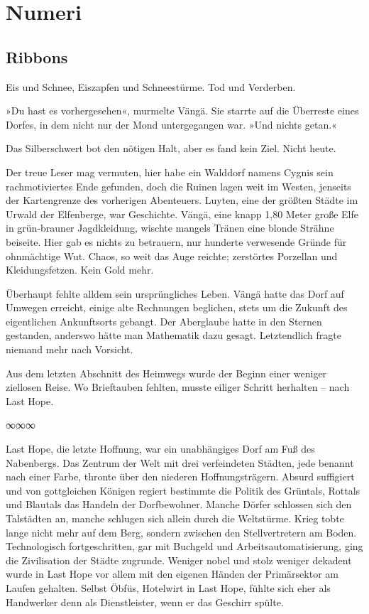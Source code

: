 \part{Numeri}

\chapter{Ribbons}

Eis und Schnee, Eiszapfen und Schneestürme. Tod und Verderben.

»Du hast es vorhergesehen«, murmelte Vängä. Sie starrte auf die Überreste eines Dorfes, in dem nicht nur der Mond untergegangen war. »Und nichts getan.«

Das Silberschwert bot den nötigen Halt, aber es fand kein Ziel. Nicht heute.

Der treue Leser mag vermuten, hier habe ein Walddorf namens Cygnis sein rachmotiviertes Ende gefunden, doch die Ruinen lagen weit im Westen, jenseits der Kartengrenze des vorherigen Abenteuers. Luyten, eine der größten Städte im Urwald der Elfenberge, war Geschichte. Vängä, eine knapp 1,80 Meter große Elfe in grün-brauner Jagdkleidung, wischte mangels Tränen eine blonde Strähne beiseite. Hier gab es nichts zu betrauern, nur hunderte verwesende Gründe für ohnmächtige Wut. Chaos, so weit das Auge reichte; zerstörtes Porzellan und Kleidungsfetzen. Kein Gold mehr.

Überhaupt fehlte alldem sein ursprüngliches Leben. Vängä hatte das Dorf auf Umwegen erreicht, einige alte Rechnungen beglichen, stets um die Zukunft des eigentlichen Ankunftsorts gebangt. Der Aberglaube hatte in den Sternen gestanden, anderswo hätte man Mathematik dazu gesagt. Letztendlich fragte niemand mehr nach Vorsicht.

Aus dem letzten Abschnitt des Heimwegs wurde der Beginn einer weniger ziellosen Reise. Wo Brieftauben fehlten, musste eiliger Schritt herhalten – nach Last Hope.

\begin{center}
∞∞∞
\end{center}

Last Hope, die letzte Hoffnung, war ein unabhängiges Dorf am Fuß des Nabenbergs. Das Zentrum der Welt mit drei verfeindeten Städten, jede benannt nach einer Farbe, thronte über den niederen Hoffnungsträgern. Absurd suffigiert und von gottgleichen Königen regiert bestimmte die Politik des Grüntals, Rottals und Blautals das Handeln der Dorfbewohner. Manche Dörfer schlossen sich den Talstädten an, manche schlugen sich allein durch die Weltstürme. Krieg tobte lange nicht mehr auf dem Berg, sondern zwischen den Stellvertretern am Boden. Technologisch fortgeschritten, gar mit Buchgeld und Arbeitsautomatisierung, ging die Zivilisation der Städte zugrunde. Weniger nobel und stolz weniger dekadent wurde in Last Hope vor allem mit den eigenen Händen der Primärsektor am Laufen gehalten. Selbst Öbfüs, Hotelwirt in Last Hope, fühlte sich eher als Handwerker denn als Dienstleister, wenn er das Geschirr spülte.

